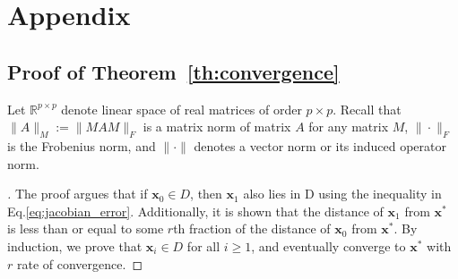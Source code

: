 \documentclass{statsoc}
\newcommand{\bx}{\boldsymbol{x}}
\begin{document}



\section{Appendix} \label{sec:appendix}

\subsection{Proof of Theorem~\ref{th:convergence}}
Let $\mathbb{R}^{p\times p}$ denote linear space of real matrices of order $p \times p$. Recall that $\|A\|_M := \|MAM\|_F$ is a matrix norm of matrix $A$ for any matrix $M$, $\|\cdot\|_F$ is the Frobenius norm, and $\|\cdot\|$ denotes a vector norm or its induced operator norm. 
\begin{proof}[]
The proof argues that if $\bx_0 \in D$, then $\bx_1$ also lies in D using the inequality in Eq.\eqref{eq:jacobian_error}. Additionally, it is shown that the distance of $\bx_1$ from $\bx^\ast$ is less than or equal to some $r$th fraction of the distance of $\bx_0$ from $\bx^\ast$. By induction, we prove that $\bx_i \in D$ for all $i \geq 1$, and eventually converge to $\bx^\ast$ with $r$ rate of convergence.


\end{proof}
\end{document}
